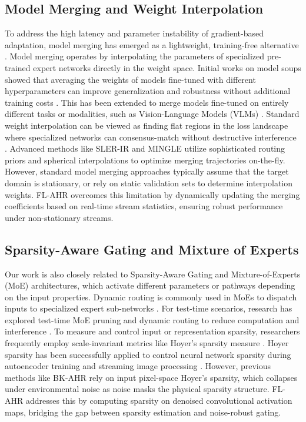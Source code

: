 \documentclass{article}
\theoremstyle{plain}
\theoremstyle{definition}
\theoremstyle{remark}
\begin{document}
\subsection{Model Merging and Weight Interpolation}
To address the high latency and parameter instability of gradient-based adaptation, model merging has emerged as a lightweight, training-free alternative \cite{guo2025everything}. Model merging operates by interpolating the parameters of specialized pre-trained expert networks directly in the weight space. Initial works on model soups showed that averaging the weights of models fine-tuned with different hyperparameters can improve generalization and robustness without additional training costs \cite{park2022representations, xie2025bone}. This has been extended to merge models fine-tuned on entirely different tasks or modalities, such as Vision-Language Models (VLMs) \cite{li2023modular, amador2022predicting, boudiaf2022parameterfree, suyahman2024data}. Standard weight interpolation can be viewed as finding flat regions in the loss landscape where specialized networks can consensus-match without destructive interference \cite{chaves2025weight, panariello2025accurate, lv2023deepmerge, bocquet2020bayesian}. Advanced methods like SLER-IR \cite{zhang2025graphshaper} and MINGLE \cite{qiu2025mingle} utilize sophisticated routing priors and spherical interpolations to optimize merging trajectories on-the-fly. However, standard model merging approaches typically assume that the target domain is stationary, or rely on static validation sets to determine interpolation weights. FL-AHR overcomes this limitation by dynamically updating the merging coefficients based on real-time stream statistics, ensuring robust performance under non-stationary streams.

\subsection{Sparsity-Aware Gating and Mixture of Experts}
Our work is also closely related to Sparsity-Aware Gating and Mixture-of-Experts (MoE) architectures, which activate different parameters or pathways depending on the input properties. Dynamic routing is commonly used in MoEs to dispatch inputs to specialized expert sub-networks \cite{du2021efficient, brants1996better}. For test-time scenarios, research has explored test-time MoE pruning and dynamic routing to reduce computation and interference \cite{koikeakino2025mumoe, lei2024adaptedmoe, duan2019sparse}. To measure and control input or representation sparsity, researchers frequently employ scale-invariant metrics like Hoyer's sparsity measure \cite{yang2019deephoyer}. Hoyer sparsity has been successfully applied to control neural network sparsity during autoencoder training \cite{zhang2026decomposing} and streaming image processing \cite{qu2022generalized}. However, previous methods like BK-AHR rely on input pixel-space Hoyer's sparsity, which collapses under environmental noise as noise masks the physical sparsity structure. FL-AHR addresses this by computing sparsity on denoised convolutional activation maps, bridging the gap between sparsity estimation and noise-robust gating.
\end{document}
